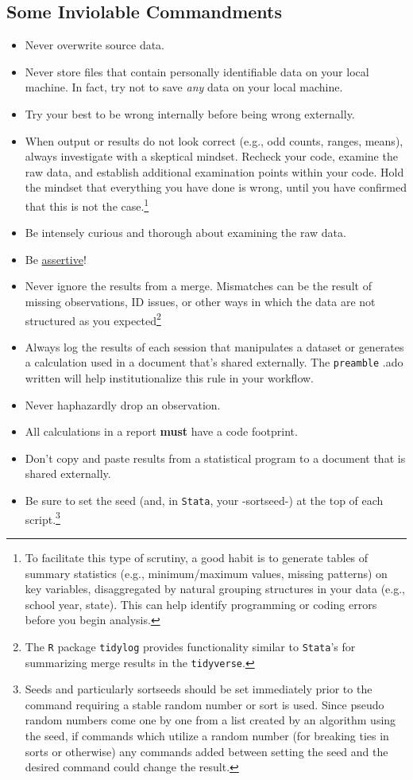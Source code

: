 \subsection{Some Inviolable Commandments}
\begin{itemize}
	\item Never overwrite source data.
	\item Never store files that contain personally identifiable data on your local machine. In fact, try not to save \emph{any} data on your local machine.
	\item Try your best to be wrong internally before being wrong externally.
	\item When output or results do not look correct (e.g., odd counts, ranges, means), always investigate with a skeptical mindset. Recheck your code, examine the raw data, and establish additional examination points within your code. Hold the mindset that everything you have done is wrong, until you have confirmed that this is not the case.\footnote{To facilitate this type of scrutiny, a good habit is to generate tables of summary statistics (e.g., minimum/maximum values, missing patterns) on key variables, disaggregated by natural grouping structures in your data (e.g., school year, state). This can help identify programming or coding errors before you begin analysis.}
	\item Be intensely curious and thorough about examining the raw data.
	\item Be \href{https://journals.sagepub.com/doi/pdf/10.1177/1536867X0400300414}{assertive}!
	\item Never ignore the results from a merge. Mismatches can be the result of missing observations, ID issues, or other ways in which the data are not structured as you expected\footnote{The \texttt{R} package \texttt{tidylog} provides functionality similar to \texttt{Stata}'s for summarizing merge results in the \texttt{tidyverse}.}
	\item Always log the results of each session that manipulates a dataset or generates a calculation used in a document that's shared externally. The \texttt{preamble} .ado written will help institutionalize this rule in your workflow.
	\item Never haphazardly drop an observation.
	\item All calculations in a report \textbf{must} have a code footprint.
	\item Don't copy and paste results from a statistical program to a document that is shared externally.
	\item Be sure to set the seed (and, in \texttt{Stata}, your -sortseed-) at the top of each script.\footnote{Seeds and particularly sortseeds should be set immediately prior to the command requiring a stable random number or sort is used. Since pseudo random numbers come one by one from a list created by an algorithm using the seed, if commands which utilize a random number (for breaking ties in sorts or otherwise) any commands added between setting the seed and the desired command could change the result.}

\end{itemize}
